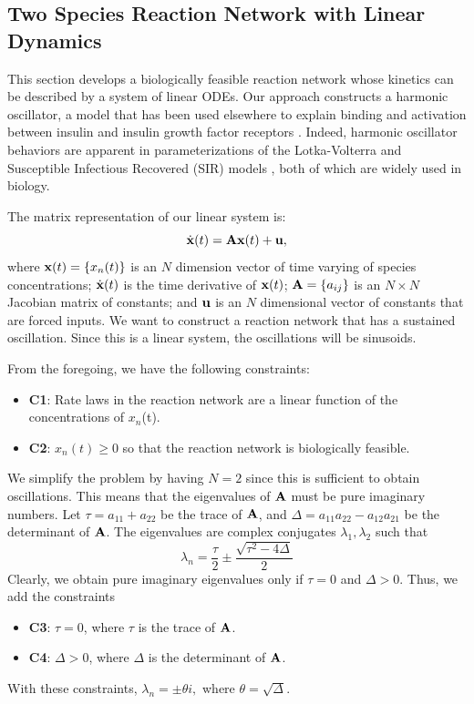 \documentclass{bmcart}
\begin{document}
\subsection*{Two Species Reaction Network with Linear Dynamics}
This section develops a biologically feasible reaction network whose kinetics can be described by a system of linear ODEs. Our approach constructs a harmonic oscillator, a model that has been used elsewhere to explain binding and activation between insulin and insulin growth factor receptors \cite{kiselyov_harmonic_2009}. Indeed, harmonic oscillator behaviors are apparent in parameterizations of the Lotka-Volterra and Susceptible Infectious Recovered (SIR) models \cite{koshkin_harmonic_2022}, both of which are widely used in biology.

The matrix representation of our linear system is: 
\begin{equation}
\dot{{\bf x}}(t) = {\bf A} {\bf x}(t) + {\bf u},
\label{eq:linear}
\end{equation}
where ${\bf x} (t) = \{x_n (t)\}$ is an $N$ 
dimension vector of time varying of 
species concentrations; $\dot {\bf x} (t)$
is the time derivative of ${\bf x}(t)$; ${\bf A} = \{a_{ij} \}$ is an $N \times N$ Jacobian matrix of constants;
and ${\bf u}$ is an $N$ dimensional vector of constants that are forced inputs. We want to construct a reaction network that has a sustained oscillation. Since this is a linear system, the oscillations will be sinusoids.

From the foregoing, we have the following constraints:
\begin{itemize}
    \item {\bf C1}: Rate laws in the reaction network are a linear function of the concentrations of $x_n$(t).
    \item {\bf C2}: $x_n(t) \geq 0$ so that the reaction network is biologically feasible.
\end{itemize}

We simplify the problem by having $N=2$ since this is sufficient to obtain oscillations. This means that the eigenvalues of ${\bf A}$ 
must be pure imaginary numbers. Let $\tau = a_{11} + a_{22}$ be the trace of ${\bf A}$, and 
$\Delta = a_{11} a_{22} - a_{12} a_{21}$ be the
determinant of ${\bf A}$. 
The eigenvalues are complex conjugates $\lambda_1, \lambda_2$ such that
\begin{equation*}
\lambda_n  = \frac{\tau}{2}  \pm \frac{\sqrt{\tau^2 - 4 \Delta}}{2}
\end{equation*}
Clearly, we obtain pure imaginary eigenvalues only if $\tau =  0$ and $\Delta > 0$. Thus, we add the constraints
\begin{itemize}
    \item {\bf C3}: $\tau = 0$, where $\tau$ is the trace of ${\bf A}$.
       \item {\bf C4}: $\Delta > 0$, where $\Delta$ is the determinant of ${\bf A}$.
\end{itemize}
With these constraints, $\lambda_n = \pm \theta i,$ where $\theta = \sqrt{\Delta}.$
\end{document}
